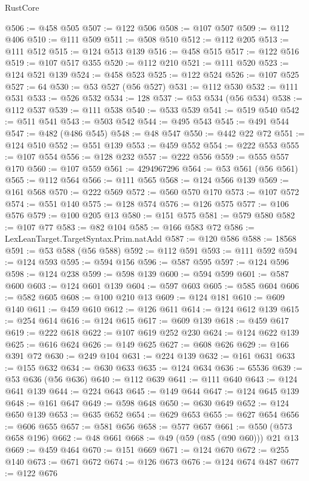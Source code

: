 \begin{lexlean}{RustCore}
\begin{coremodule}
@506 := @458 @505
@507 := @122 @506
@508 := @107 @507
@509 := @112 @406
@510 := @111 @509
@511 := @508 @510
@512 := @112 @205
@513 := @111 @512
@515 := @124 @513 @139
@516 := @458 @515
@517 := @122 @516
@519 := @107 @517 @355
@520 := @112 @210
@521 := @111 @520
@523 := @124 @521 @139
@524 := @458 @523
@525 := @122 @524
@526 := @107 @525
@527 := 64
@530 := @53 @527 (@56 @527)
@531 := @112 @530
@532 := @111 @531
@533 := @526 @532
@534 := 128
@537 := @53 @534 (@56 @534)
@538 := @112 @537
@539 := @111 @538
@540 := @533 @539
@541 := @519 @540
@542 := @511 @541
@543 := @503 @542
@544 := @495 @543
@545 := @491 @544
@547 := @482 (@486 @545)
@548 := @48 @547
@550 := @442 @22 @72
@551 := @124 @510
@552 := @551 @139
@553 := @459 @552
@554 := @222 @553
@555 := @107 @554
@556 := @128 @232
@557 := @222 @556
@559 := @555 @557 @170
@560 := @107 @559
@561 := 4294967296
@564 := @53 @561 (@56 @561)
@565 := @112 @564
@566 := @111 @565
@568 := @124 @566 @139
@569 := @161 @568
@570 := @222 @569
@572 := @560 @570 @170
@573 := @107 @572
@574 := @551 @140
@575 := @128 @574
@576 := @126 @575
@577 := @106 @576
@579 := @100 @205 @13
@580 := @151 @575
@581 := @579 @580
@582 := @107 @77
@583 := @82 @104
@585 := @166 @583 @72
@586 := LexLeanTarget.TargetSyntax.Prim.natAdd
@587 := @120 @586
@588 := 18568
@591 := @53 @588 (@56 @588)
@592 := @112 @591
@593 := @111 @592
@594 := @124 @593
@595 := @594 @156
@596 := @587 @595
@597 := @124 @596
@598 := @124 @238
@599 := @598 @139
@600 := @594 @599
@601 := @587 @600
@603 := @124 @601 @139
@604 := @597 @603
@605 := @585 @604
@606 := @582 @605
@608 := @100 @210 @13
@609 := @124 @181
@610 := @609 @140
@611 := @459 @610
@612 := @126 @611
@614 := @124 @612 @139
@615 := @254 @614
@616 := @124 @615
@617 := @609 @139
@618 := @459 @617
@619 := @222 @618
@622 := @107 @619 @252 @230
@624 := @124 @622 @139
@625 := @616 @624
@626 := @149 @625
@627 := @608 @626
@629 := @166 @391 @72
@630 := @249 @104
@631 := @224 @139
@632 := @161 @631
@633 := @155 @632
@634 := @630 @633
@635 := @124 @634
@636 := 65536
@639 := @53 @636 (@56 @636)
@640 := @112 @639
@641 := @111 @640
@643 := @124 @641 @139
@644 := @224 @643
@645 := @149 @644
@647 := @124 @645 @139
@648 := @161 @647
@649 := @598 @648
@650 := @630 @649
@652 := @124 @650 @139
@653 := @635 @652
@654 := @629 @653
@655 := @627 @654
@656 := @606 @655
@657 := @581 @656
@658 := @577 @657
@661 := @550 (@573 @658 @196)
@662 := @48 @661
@668 := @49 (@59 (@85 (@90 @60))) @21 @13
@669 := @459 @464
@670 := @151 @669
@671 := @124 @670
@672 := @255 @140
@673 := @671 @672
@674 := @126 @673
@676 := @124 @674 @487
@677 := @122 @676

\end{coremodule}
\end{lexlean}
